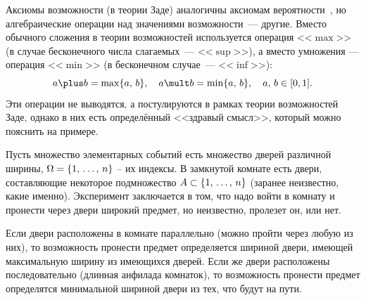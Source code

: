 Аксиомы возможности (в теории Заде) аналогичны аксиомам вероятности~\cite{kolmogorov}, но алгебраические операции над значениями возможности~--- другие. Вместо обычного сложения в теории возможностей используется операция <<$\max$>> (в случае бесконечного числа слагаемых~--- <<$\sup$>>), а вместо умножения --- операция <<$\min$>> (в бесконечном случае~--- <<$\inf$>>):
\begin{equation}
\label{operations_zadeh}
    a \plus b = \max\{a,\, b\}, \quad a \mult b = \min\{a,\, b\}, \quad a,\,b \in [0,1].
\end{equation}
Эти операции не выводятся, а постулируются в рамках теории возможностей Заде, однако в них есть определённый <<здравый смысл>>, который можно пояснить на примере. \label{example_zadeh}
\begin{example}
Пусть множество элементарных событий есть множество дверей различной ширины, $\Omega = \{1,\, \ldots,\, n\}$ -- их индексы. В замкнутой комнате есть двери, составляющие некоторое подмножество $A \subset \{1,\, \ldots,\, n\}$ (заранее неизвестно, какие именно).  Эксперимент заключается в том, что надо войти в комнату и пронести через двери широкий предмет, но неизвестно, пролезет он, или нет. 

Если двери расположены в комнате параллельно (можно пройти через любую из них), то возможность пронести предмет определяется шириной двери, имеющей максимальную ширину из имеющихся дверей. Если же двери расположены последовательно (длинная анфилада комнаток), то возможность пронести предмет определятся минимальной шириной двери из тех, что будут на пути.
\end{example}

